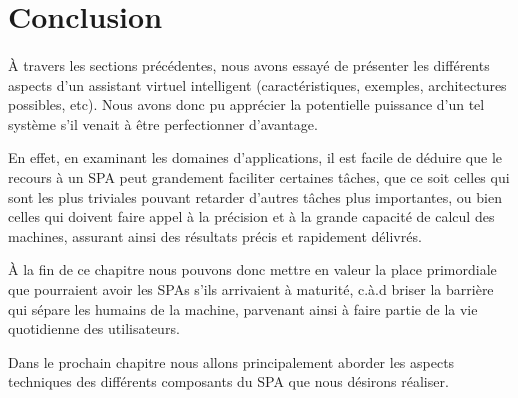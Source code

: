 \section{Conclusion}
\paragraph{}
À travers les sections précédentes, nous avons essayé de présenter les différents aspects d'un assistant virtuel intelligent (caractéristiques, exemples, architectures possibles, etc). Nous avons donc pu apprécier la potentielle puissance d'un tel système s'il venait à être perfectionner d'avantage.
\par En effet, en examinant les domaines d'applications, il est facile de déduire que le recours à un SPA peut grandement faciliter certaines tâches, que ce soit celles qui sont les plus triviales pouvant retarder d'autres tâches plus importantes, ou bien celles qui doivent faire appel à la précision et à la grande capacité de calcul des machines, assurant ainsi des résultats précis et rapidement délivrés.
\par
À la fin de ce chapitre nous pouvons donc mettre en valeur la place primordiale que pourraient avoir les SPAs s'ils arrivaient à maturité, c.à.d briser la barrière qui sépare les humains de la machine, parvenant ainsi à faire partie de la vie quotidienne des utilisateurs. 
\par Dans le prochain chapitre nous allons principalement aborder les aspects techniques des différents composants du SPA que nous désirons réaliser.

 
